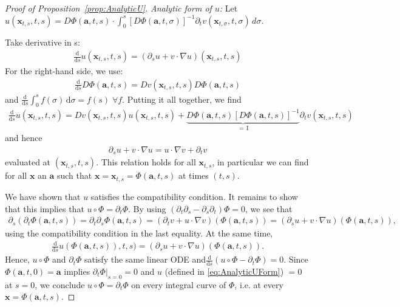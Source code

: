 \documentclass[10pt,a4paper]{amsart}
\newcommand{\Flow}{\Phi}
\newcommand{\bfa}{\boldsymbol{a}}
\newcommand{\bfx}{\boldsymbol{x}}
\newcommand{\rd}{\mathrm d}
\begin{document}
\begin{proof}[Proof of Proposition~\ref{prop:AnalyticU}]
\emph{Analytic form of $u$:} Let $u(\bfx_{t,s}, t, s) = D\Flow(\bfa, t, s) \cdot \int_0^s \left[ D\Flow(\bfa, t, \sigma) \right ]^{-1} \partial_t v(\bfx_{t,\sigma}, t, \sigma) \, d\sigma$.

    Take derivative in s:
    \begin{align}
        \frac{\mathrm d}{\mathrm d s} u(\bfx_{t,s}, t, s) = (\partial_s u + v \cdot \nabla u)(\bfx_{t,s}, t, s)
    \end{align}
    For the right-hand side, we use:
    \begin{align}
        \frac{\mathrm d}{\mathrm d s} D\Flow(\bfa, t, s) = Dv(\bfx_{t,s}, t, s) D\Flow(\bfa, t, s)
    \end{align}
    and $\frac{\mathrm d}{\mathrm d s} \int_0^s f(\sigma) \, \mathrm d\sigma = f(s) \; \forall f$. Putting it all together, we find
    \begin{align}
        \frac{\mathrm d}{\mathrm d s} u(\bfx_{t,s}, t, s) = Dv(\bfx_{t,s}, t, s) u(\bfx_{t,s}, t, s) + \underbrace{D\Flow(\bfa, t, s) \left[ D\Flow(\bfa, t, s) \right ]^{-1}}_{= \, \mathrm{I}} \partial_t v(\bfx_{t,s}, t, s)
    \end{align}
    and hence
    \begin{align}
        \partial_s u + v \cdot \nabla u = u \cdot \nabla v + \partial_t v
    \end{align}
    evaluated at $(\bfx_{t,s}, t, s)$.
    This relation holds for all $\bfx_{t,s}$, in particular we can find for all $\bfx$ an $\bfa$ such that $\bfx = \bfx_{t,s} = \Phi(\bfa, t, s)$ at times $(t, s)$.

We have shown that $u$ satisfies the compatibility condition. It remains to show that this implies that $u \circ \Flow = \partial_t \Flow$. By using $(\partial_t \partial_s - \partial_s \partial_t) \Flow = 0$, we see that
\begin{align}
    \partial_s \left( \partial_t \Flow(\bfa, t, s) \right) = \partial_t \partial_s \Flow(\bfa, t, s) = (\partial_t v + u \cdot \nabla v)(\Flow(\bfa, t, s)) = (\partial_s u + v \cdot \nabla u)(\Flow(\bfa, t, s)),
\end{align}
using the compatibility condition in the last equality. At the same time,
\begin{align}
    \frac{\rd}{\rd s} u(\Flow(\bfa, t, s)), t, s) = (\partial_s u + v \cdot \nabla u)(\Flow(\bfa, t, s)).
\end{align}
Hence, $u \circ \Flow$ and $\partial_t \Flow$ satisfy the same linear ODE and$\frac{\rd}{\rd s} \left( u \circ \Flow - \partial_t \Flow \right) = 0$. Since $\Phi(\bfa, t, 0) = \bfa$ implies $\partial_t \Flow \big |_{s = 0} = 0$ and $u$ (defined in \eqref{eq:AnalyticUForm}) $= 0$ at $s = 0$, we conclude $u \circ \Flow = \partial_t \Flow$ on every integral curve of $\Flow$, i.e. at every $\bfx = \Flow(\bfa, t, s)$.


\end{proof}
\end{document}

